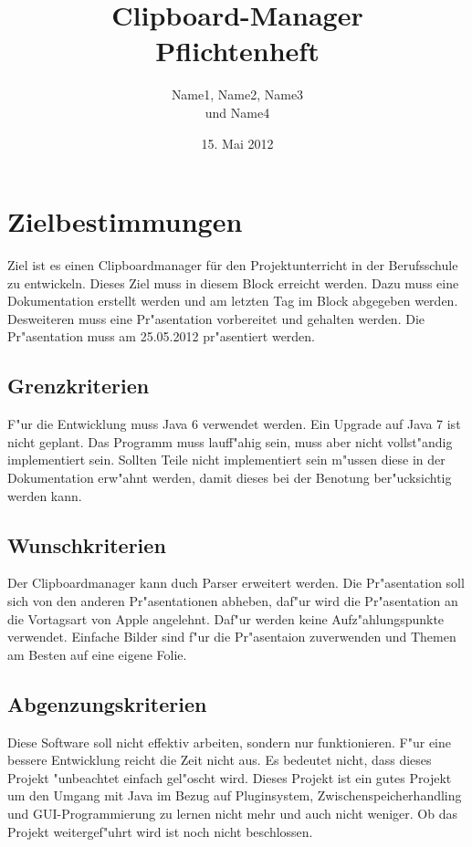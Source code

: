\documentclass[a4paper,11pt,abstracton,titlepage]{scrartcl}
\title{Clipboard-Manager\\Pflichtenheft}
\author{Name1, Name2, Name3\\ und Name4}
\date{15. Mai 2012}
\begin{document}
\maketitle

\tableofcontents
\thispagestyle{empty}
\newpage
\setlength{\parskip}{1em}
\setcounter{page}{1}
\section{Zielbestimmungen}
Ziel ist es einen Clipboardmanager für den Projektunterricht in der Berufsschule zu entwickeln. Dieses Ziel muss in diesem Block erreicht werden.
Dazu muss eine Dokumentation erstellt werden und am letzten Tag im Block abgegeben werden.
Desweiteren muss eine Pr"asentation vorbereitet und gehalten werden. Die Pr"asentation muss am 25.05.2012 pr"asentiert werden.
\subsection{Grenzkriterien}
F"ur die Entwicklung muss Java\footnotesize{\texttrademark} \normalsize 6 verwendet werden. Ein Upgrade auf Java\footnotesize{\texttrademark} \normalsize 7 ist nicht geplant.
Das Programm muss lauff"ahig sein, muss aber nicht vollst"andig implementiert sein. Sollten Teile nicht implementiert sein m"ussen diese in der Dokumentation erw"ahnt werden, damit dieses bei der Benotung ber"ucksichtig werden kann.
\subsection{Wunschkriterien}
Der Clipboardmanager kann duch Parser erweitert werden.
Die Pr"asentation soll sich von den anderen Pr"asentationen abheben, daf"ur wird die Pr"asentation an die Vortagsart von Apple angelehnt. Daf"ur werden keine Aufz"ahlungspunkte verwendet. Einfache Bilder sind f"ur die Pr"asentaion zuverwenden und Themen am Besten auf eine eigene Folie.
\subsection{Abgenzungskriterien}
Diese Software soll nicht effektiv arbeiten, sondern nur funktionieren.
F"ur eine bessere Entwicklung reicht die Zeit nicht aus. Es bedeutet nicht, dass dieses  Projekt "unbeachtet einfach gel"oscht wird. Dieses Projekt ist ein gutes Projekt um den Umgang mit Java\footnotesize{\texttrademark} \normalsize im Bezug auf Pluginsystem, Zwischenspeicherhandling und GUI-Programmierung zu lernen nicht mehr und auch nicht weniger. Ob das Projekt weitergef"uhrt wird ist noch nicht beschlossen.  
\end{document}
